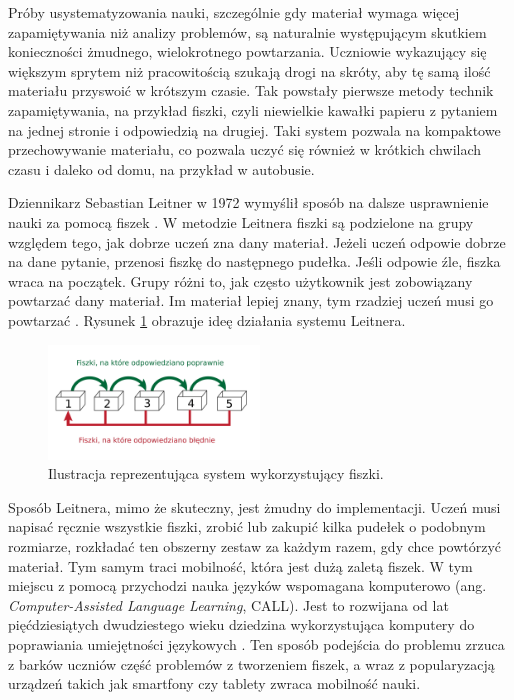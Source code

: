 \documentclass[a4paper,twoside,12pt]{book}
\newcommand{\obcy}[1]{\emph{#1}}
\newcommand{\english}[1]{{\selectlanguage{british}\obcy{#1}}}
\begin{document}


Próby usystematyzowania nauki, szczególnie gdy materiał wymaga więcej zapamiętywania niż analizy problemów, są naturalnie występującym skutkiem konieczności żmudnego, wielokrotnego powtarzania. Uczniowie wykazujący się większym sprytem niż pracowitością szukają drogi na skróty, aby tę samą ilość materiału przyswoić w krótszym czasie. Tak powstały pierwsze metody technik zapamiętywania, na przykład fiszki, czyli niewielkie kawałki papieru z pytaniem na jednej stronie i odpowiedzią na drugiej. Taki system pozwala na kompaktowe przechowywanie materiału, co pozwala uczyć się również w krótkich chwilach czasu i daleko od domu, na przykład w autobusie. 

Dziennikarz Sebastian Leitner w 1972 wymyślił sposób na dalsze usprawnienie nauki za pomocą fiszek \cite{bib:internetLeitner, bib:duolingoHLR}. W metodzie Leitnera fiszki są podzielone na grupy względem tego, jak dobrze uczeń zna dany materiał. Jeżeli uczeń odpowie dobrze na dane pytanie, przenosi fiszkę do następnego pudełka. Jeśli odpowie źle, fiszka wraca na początek. Grupy różni to, jak często użytkownik jest zobowiązany powtarzać dany materiał. Im materiał lepiej znany, tym rzadziej uczeń musi go powtarzać \cite{bib:leitner}. Rysunek \ref{fig:leitner} obrazuje ideę działania systemu Leitnera.

\begin{figure}
\centering
\includegraphics[width=0.5\textwidth]{leitner_system}
\caption{Ilustracja reprezentująca system wykorzystujący fiszki.}
\label{fig:leitner}
\end{figure}

Sposób Leitnera, mimo że skuteczny, jest żmudny do implementacji. Uczeń musi napisać ręcznie wszystkie fiszki, zrobić lub zakupić kilka pudełek o podobnym rozmiarze, rozkładać ten obszerny zestaw za każdym razem, gdy chce powtórzyć materiał. Tym samym traci mobilność, która jest dużą zaletą fiszek. W tym miejscu z pomocą przychodzi nauka języków wspomagana komputerowo (ang. {\english{Computer-Assisted Language Learning}}, CALL). Jest to rozwijana od lat pięćdziesiątych dwudziestego wieku dziedzina wykorzystująca komputery do poprawiania umiejętności językowych \citep{bib:konferencjaCALLhistory}. Ten sposób podejścia do problemu zrzuca z barków uczniów część problemów z tworzeniem fiszek, a wraz z popularyzacją urządzeń takich jak smartfony czy tablety zwraca mobilność nauki. 
\end{document}
